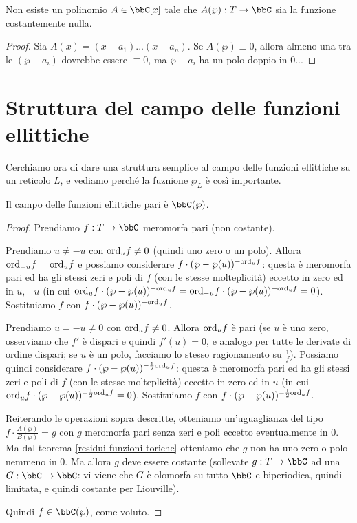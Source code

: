 \begin{teorema}
Non esiste un polinomio $A\in\bbC[x]$ tale che $A(\wp):T\rar\bbC$ sia la funzione costantemente nulla.
\end{teorema}
\begin{proof}
Sia $A(x)=(x-a_1)...(x-a_n)$. Se $A(\wp)\equiv0$, allora almeno una tra le $(\wp-a_i)$ dovrebbe essere $\equiv0$, ma $\wp-a_i$ ha un polo doppio in $0$...
\end{proof}


\section{Struttura del campo delle funzioni ellittiche}
Cerchiamo ora di dare una struttura semplice al campo delle funzioni ellittiche su un reticolo $L$, e vediamo perché la fuznione $\wp_L$ è così importante.

\begin{teorema}
Il campo delle funzioni ellittiche pari è $\bbC(\wp)$.
\end{teorema}
\begin{proof}
Prendiamo $f:T\rar\bbC$ meromorfa pari (non costante).

Prendiamo $u\not=-u$ con $\text{ord}_uf\not=0$ (quindi uno zero o un polo). Allora $\text{ord}_{-u}f=\text{ord}_uf$ e possiamo considerare $f\cdot(\wp-\wp(u))^{-\text{ord}_uf}$:
questa è meromorfa pari ed ha gli stessi zeri e poli di $f$ (con le stesse molteplicità) eccetto
in zero ed in $u,-u$ (in cui $\text{ord}_uf\cdot(\wp-\wp(u))^{-\text{ord}_uf}=\text{ord}_{-u}f\cdot(\wp-\wp(u))^{-\text{ord}_uf}=0$).
Sostituiamo $f$ con $f\cdot(\wp-\wp(u))^{-\text{ord}_uf}$.

Prendiamo $u=-u\not=0$ con $\text{ord}_uf\not=0$. Allora $\text{ord}_uf$ è pari (se $u$ è uno zero, osserviamo che $f'$ è dispari e quindi $f'(u)=0$, e analogo per tutte le derivate di ordine dispari;
se $u$ è un polo, facciamo lo stesso ragionamento su $\frac{1}{f}$). Possiamo quindi considerare $f\cdot(\wp-\wp(u))^{-\frac{1}{2}\text{ord}_uf}$:
questa è meromorfa pari ed ha gli stessi zeri e poli di $f$ (con le stesse molteplicità) eccetto in zero ed in $u$ (in cui $\text{ord}_uf\cdot(\wp-\wp(u))^{-\frac{1}{2}\text{ord}_uf}=0$).
Sostituiamo $f$ con $f\cdot(\wp-\wp(u))^{-\frac{1}{2}\text{ord}_uf}$.

Reiterando le operazioni sopra descritte, otteniamo un'uguaglianza del tipo $f\cdot\frac{A(\wp)}{B(\wp)}=g$ con $g$ meromorfa pari senza zeri e poli eccetto eventualmente in $0$.
Ma dal teorema \ref{residui-funzioni-toriche} otteniamo che $g$ non ha uno zero o polo nemmeno in $0$. Ma allora $g$ deve essere costante
(sollevate $g:T\rar\bbC$ ad una $G:\bbC\rar\bbC$: vi viene che $G$ è olomorfa su tutto $\bbC$ e biperiodica, quindi limitata, e quindi costante per Liouville).

Quindi $f\in\bbC(\wp)$, come voluto.
\end{proof}

